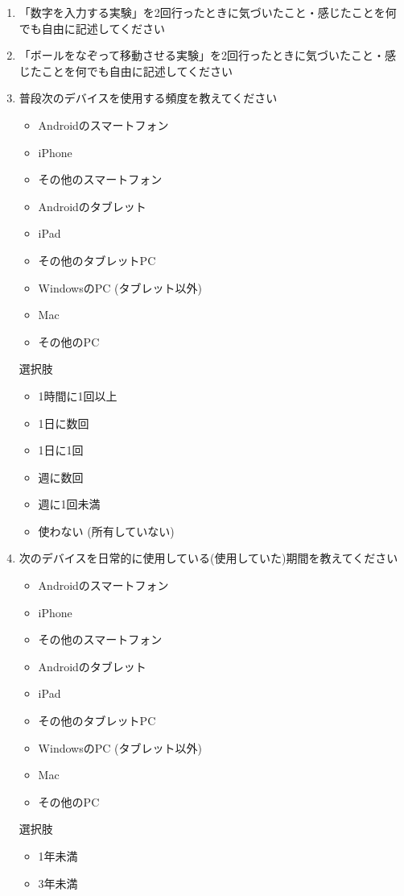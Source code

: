 \begin{enumerate}
  \item 「数字を入力する実験」を2回行ったときに気づいたこと・感じたことを何でも自由に記述してください
  \item 「ボールをなぞって移動させる実験」を2回行ったときに気づいたこと・感じたことを何でも自由に記述してください
  \item 普段次のデバイスを使用する頻度を教えてください
  \begin{itemize}
  \item Androidのスマートフォン
  \item iPhone
  \item その他のスマートフォン
  \item Androidのタブレット
  \item iPad
  \item その他のタブレットPC
  \item WindowsのPC (タブレット以外)
  \item Mac
  \item その他のPC
\end{itemize}
選択肢
\begin{itemize}
  \item 1時間に1回以上
  \item 1日に数回
  \item 1日に1回
  \item 週に数回
  \item 週に1回未満
  \item 使わない (所有していない)
\end{itemize}
\item 次のデバイスを日常的に使用している(使用していた)期間を教えてください
  \begin{itemize}
  \item Androidのスマートフォン
  \item iPhone
  \item その他のスマートフォン
  \item Androidのタブレット
  \item iPad
  \item その他のタブレットPC
  \item WindowsのPC (タブレット以外)
  \item Mac
  \item その他のPC
\end{itemize}
選択肢
\begin{itemize}
  \item 1年未満
  \item 3年未満

\end{itemize}
\end{enumerate}
